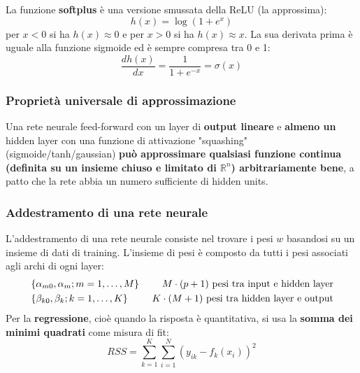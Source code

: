 \documentclass[a4paper]{article}
\begin{document}
\begin{itemize}
    \vspace{1em}
    \noindent
    La funzione \textbf{softplus} è una versione smussata della ReLU (la approssima):
    \[
      h(x) = \log(1 + e^{x})
    \] 
    per \( x < 0 \) si ha \( h(x) \approx 0 \) e per \( x > 0 \) si ha \( h(x) \approx x \).
    La sua derivata prima è uguale alla funzione sigmoide ed è sempre compresa tra 0 e 1:
    \[
      \frac{dh(x)}{dx} = \frac{1}{1 + e^{-x}} = \sigma(x)
    \] 
\end{itemize}

\subsubsection{Proprietà universale di approssimazione}
\begin{theorem}
  Una rete neurale feed-forward con un layer di \textbf{output lineare} e \textbf{almeno un}
  hidden layer con una funzione di attivazione "squashing" (sigmoide/tanh/gaussian)
  \textbf{può approssimare qualsiasi funzione continua (definita su un insieme chiuso e
    limitato di \( \mathbb{R}^n \)) arbitrariamente bene}, a patto che la rete abbia un
    numero sufficiente di hidden units.
\end{theorem}

\subsubsection{Addestramento di una rete neurale}
L'addestramento di una rete neurale consiste nel trovare i pesi \( w \) basandosi
su un insieme di dati di training. L'insieme di pesi è composto da tutti i pesi
associati agli archi di ogni layer:
\[
   \begin{aligned}
     &\left\{ \alpha_{m0}, \alpha_{m}; m = 1, \ldots, M \right\}
     &\text{ \( M \cdot (p+1) \) pesi tra input e hidden layer}\\
     &\left\{ \beta_{k0}, \beta_{k}; k = 1, \ldots, K \right\}
     &\text{ \( K \cdot (M+1) \) pesi tra hidden layer e output}
   \end{aligned}
\] 
Per la \textbf{regressione}, cioè quando la risposta è quantitativa, si usa
la \textbf{somma dei minimi quadrati} come misura di fit:
\[
  RSS = \sum_{k=1}^{K} \sum_{i=1}^{N} \left( y_{ik} - f_k(x_i) \right)^2
\] 
\end{document}
